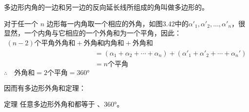 \begin{figure}
    \begin{minipage}[t]{0.48\linewidth}
    \centering
\begin{tikzpicture}[>=latex, scale=1]
    \end{tikzpicture}
    \caption{}
    \end{minipage}
    \begin{minipage}[t]{0.48\linewidth}
    \centering
    \begin{tikzpicture}[>=latex, scale=1]
    \end{tikzpicture}
    \caption{}
    \end{minipage}
    \end{figure}

\begin{Definition}
多边形内角的一边和另一边的反向延长线所组成的角叫做多边形的。
\end{Definition}

对于任一个 $n$ 边形每一内角取一个相应的外角，如图3.42中的$\alpha'_1, \alpha'_2,\ldots,\alpha'_n$，很显然，一个内角与它相应的一个外角和为一个平角，因此：
\[\begin{split}
  (n-2)  \text{个平角外角和}+\text{外角和}&=\text{内角和}+\text{外角和}\\
  &=(\alpha_1+\alpha_2+\cdots+\alpha_n)+(\alpha'_1+\alpha'_2+\cdots+\alpha_n')\\
  &=n\text{个平角}
\end{split}\]
$\therefore\quad \text{外角和}=\text{2个平角}=3\ang{60}$

因而有多边形外角和定理：

\begin{Theorem}[多边形外角和定理]{定理}
任意多边形外角和都等于 、\ang{360}。
\end{Theorem}


